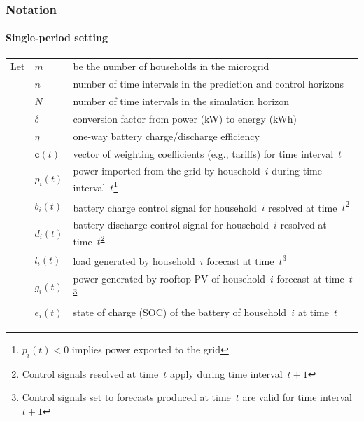\documentclass[handout, smaller, xcolor=table]{beamer}			%
\def\el{l}
\begin{document}
\begin{frame}
	\frametitle{Notation}
	\framesubtitle{Single-period setting}
	
	\begin{tabular}{l l l}
		Let & $m$ & be the number of households in the microgrid\\
		& $n$ & number of time intervals in the prediction and control horizons\\
		& $N$ & number of time intervals in the simulation horizon\\
		& $\delta$ & conversion factor from power (kW) to energy (kWh)\\
		& $\eta$ & one-way battery charge/discharge efficiency\\
		& $\boldsymbol{c}(t)$ & vector of weighting coefficients (e.g., tariffs) for time interval~$t$\\
		& $p_{i}(t)$ & power imported from the grid by household~$i$ during time interval~$t$\footnote{
$p_{i}(t) < 0$ implies power exported to the grid	
}\\
		& $b_{i}(t)$ & battery charge control signal for household~$i$ resolved at time~$t$\footnote{\label{fn:symbol1}
Control signals resolved at time~$t$ apply during time interval~$t\!+\!1$
}\\
		& $d_{i}(t)$ & battery discharge control signal for household~$i$ resolved at time~$t$\textsuperscript{\ref{fn:symbol1}}\\
		& $\el_{i}(t)$ & load generated by household~$i$ forecast at time~$t$\footnote{\label{fn:symbol2}
Control signals set to forecasts produced at time~$t$ are valid for time interval~$t\!+\!1$
}\\
		& $g_{i}(t)$ & power generated by rooftop PV of household~$i$ forecast at time~$t$\textsuperscript{\ref{fn:symbol2}}\\
		& $e_{i}(t)$ & state of charge (SOC) of the battery of household~$i$ at time~$t$\\	
	\end{tabular}
	
\end{frame}
\end{document}
